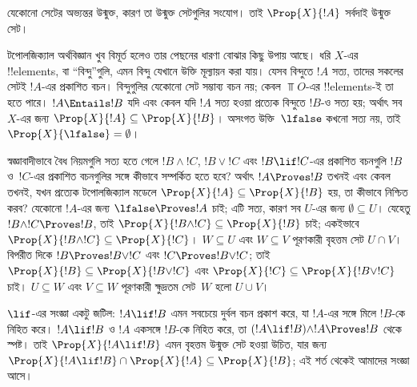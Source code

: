\documentclass[../../../include/open-logic-section]{subfiles}
\begin{document}
যেকোনো সেটের অভ্যন্তর উন্মুক্ত, কারণ তা উন্মুক্ত সেটগুলির
সংযোগ। তাই $\Prop{X}{!A}$ সর্বদাই উন্মুক্ত সেট।

টপোলজিক্যাল অর্থবিজ্ঞান খুব বিমূর্ত হলেও তার পেছনের ধারণা
বোঝার কিছু উপায় আছে। ধরি $X$-এর !!{element}s, বা
``বিন্দু''গুলি, এমন বিন্দু যেখানে উক্তি মূল্যায়ন করা যায়। যেসব
বিন্দুতে $!A$ সত্য, তাদের সকলের সেটই $!A$-এর প্রকাশিত বচন।
বিন্দুগুলির যেকোনো সেট সম্ভাব্য বচন নয়; কেবল $\Top{O}$-এর
!!{element}s-ই তা হতে পারে। $!A \Entails !B$ যদি এবং কেবল
যদি $!A$ সত্য হওয়া প্রত্যেক বিন্দুতে $!B$-ও সত্য হয়; অর্থাৎ সব
$X$-এর জন্য $\Prop{X}{!A} \subseteq \Prop{X}{!B}$। অসংগত
উক্তি~$\lfalse$ কখনো সত্য নয়, তাই
$\Prop{X}{\lfalse} = \emptyset$।

স্বজ্ঞাবাদীভাবে বৈধ নিয়মগুলি সত্য হতে গেলে $!B \land !C$,
$!B \lor !C$ এবং $!B \lif !C$-এর প্রকাশিত বচনগুলি $!B$ ও~$!C$-এর
প্রকাশিত বচনগুলির সঙ্গে কীভাবে সম্পর্কিত হতে হবে? অর্থাৎ $!A
\Proves !B$ তখনই এবং কেবল তখনই, যখন প্রত্যেক টপোলজিক্যাল মডেলে $\Prop{X}{!A} \subseteq
\Prop{X}{!B}$ হয়, তা কীভাবে নিশ্চিত করব? যেকোনো $!A$-এর জন্য
$\lfalse \Proves !A$ চাই; এটি সত্য, কারণ সব $U$-এর জন্য
$\emptyset \subseteq U$। যেহেতু $!B \land !C \Proves !B$,
তাই $\Prop{X}{!B \land !C} \subseteq \Prop{X}{!B}$ চাই;
একইভাবে $\Prop{X}{!B \land !C} \subseteq \Prop{X}{!C}$।
$W \subseteq U$ এবং $W \subseteq V$ পূরণকারী বৃহত্তম সেট
$U \cap V$। বিপরীত দিকে $!B \Proves !B \lor !C$ এবং
$!C \Proves !B \lor !C$; তাই
$\Prop{X}{!B} \subseteq \Prop{X}{!B \lor !C}$ এবং
$\Prop{X}{!C} \subseteq \Prop{X}{!B \lor !C}$ চাই।
$U \subseteq W$ এবং $V \subseteq W$ পূরণকারী ক্ষুদ্রতম সেট~$W$
হলো $U \cup V$।

$\lif$-এর সংজ্ঞা একটু জটিল: $!A \lif !B$ এমন সবচেয়ে দুর্বল
বচন প্রকাশ করে, যা $!A$-এর সঙ্গে মিলে $!B$-কে নিহিত করে।
$!A \lif !B$ ও $!A$ একসঙ্গে $!B$-কে নিহিত করে, তা
$(!A \lif !B) \land !A \Proves !B $ থেকে স্পষ্ট। তাই
$\Prop{X}{!A \lif !B}$ এমন বৃহত্তম উন্মুক্ত সেট হওয়া উচিত,
যার জন্য $\Prop{X}{!A \lif !B} \cap \Prop{X}{!A}
\subseteq \Prop{X}{!B}$; এই শর্ত থেকেই আমাদের সংজ্ঞা আসে।
\end{document}
